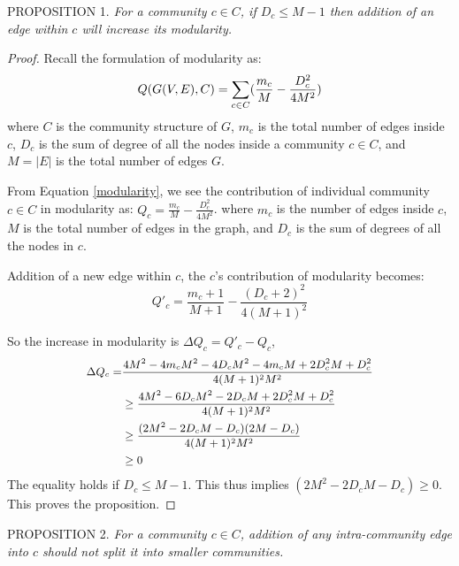 PROPOSITION 1.
{\em
For a community $c\in C$, if $D_c\leq M-1$ then addition of an edge within $c$ will increase its modularity.}

\begin{proof}
Recall the formulation of modularity as:
\begin{equation}\label{modularity}\small
Q(G(V,E),C)=\sum_{c\in C} (\frac{m_c}{M} - \frac{D_c^2}{4M^2})
\end{equation}
where $C$ is the community structure of $G$, $m_c$ is the total number of edges inside $c$, $D_c$ is the sum of degree of all the nodes inside a community $c\in C$, and $M=|E|$ is the total number of edges $G$.


From Equation \ref{modularity}, we see the contribution of individual community $c\in C$ in modularity as: $Q_c=\frac{m_c}{M} - \frac{D_c^2}{4M^2}$. 
where $m_c$ is the number of edges inside $c$, $M$ is the total number of edges in the graph, and $D_c$ is the sum of degrees of all the nodes in $c$. 

Addition of a new edge within $c$, the $c$'s contribution of modularity becomes:
\[
Q'_c=\frac{m_c+1}{M+1} - \frac{(D_c+2)^2}{4(M+1)^2}
\]

So the increase in modularity is $\Delta Q_c=Q'_c-Q_c$,
\[\small
\begin{split}
\Delta Q_c=&\frac{4M^2-4m_cM^2-4D_cM^2-4m_cM+2D_c^2M+D_c^2}{4(M+1)^2M^2}\\
&\geq \frac{4M^2-6D_cM^2-2D_cM+2D_c^2M+D_c^2}{4(M+1)^2M^2}\\
&\geq\frac{(2M^2-2D_cM-D_c)(2M-D_c)}{4(M+1)^2M^2}\\
&\geq 0
\end{split}
\]
The equality holds if $D_c\leq M-1$. This thus implies $(2M^2-2D_cM-D_c)\geq 0$. This proves the proposition.
\end{proof}

PROPOSITION 2.
{\em For a community $c\in C$, addition of any intra-community edge into $c$ should not split it into smaller communities.}


